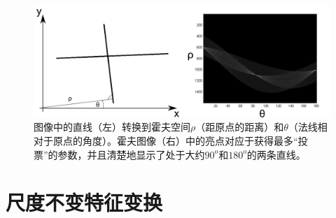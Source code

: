 \begin{figure}
\center
\includegraphics[width=\textwidth]{figs/houghtransform}
\caption{
图像中的直线（左）转换到霍夫空间$\rho$（距原点的距离）和$\theta$（法线相对于原点的角度）。霍夫图像（右）中的亮点对应于获得最多“投票”的参数，并且清楚地显示了处于大约$90^o$和$180^o$的两条直线。
\label{fig:hough}}
\end{figure}



\section{尺度不变特征变换}

